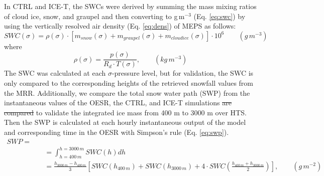 \documentclass{ametsocV5}
\providecommand{\DIFdel}[1]{{\protect\color{red}\sout{#1}}}                      %
\providecommand{\DIFaddbegin}{} %
\providecommand{\DIFaddend}{} %
\providecommand{\DIFdelbegin}{} %
\providecommand{\DIFdelend}{} %
\newcommand{\DIFscaledelfig}{0.5}
\newlength{\DIFdelgraphicswidth} %
\newlength{\DIFdelgraphicsheight} %
\newcommand{\DIFaddincludegraphics}[2][]{{\color{blue}\fbox{\DIFOincludegraphics[#1]{#2}}}} %
\newcommand{\DIFdelincludegraphics}[2][]{%
\sbox{\DIFdelgraphicsbox}{\DIFOincludegraphics[#1]{#2}}%
\settoboxwidth{\DIFdelgraphicswidth}{\DIFdelgraphicsbox} %
\settoboxtotalheight{\DIFdelgraphicsheight}{\DIFdelgraphicsbox} %
\scalebox{\DIFscaledelfig}{%
\parbox[b]{\DIFdelgraphicswidth}{\usebox{\DIFdelgraphicsbox}\\[-\baselineskip] \rule{\DIFdelgraphicswidth}{0em}}\llap{\resizebox{\DIFdelgraphicswidth}{\DIFdelgraphicsheight}{%
\setlength{\unitlength}{\DIFdelgraphicswidth}%
\begin{picture}(1,1)%
\thicklines\linethickness{2pt} %
{\color[rgb]{1,0,0}\put(0,0){\framebox(1,1){}}}%
{\color[rgb]{1,0,0}\put(0,0){\line( 1,1){1}}}%
{\color[rgb]{1,0,0}\put(0,1){\line(1,-1){1}}}%
\end{picture}%
}\hspace*{3pt}}} %
} %
\DeclareRobustCommand{\DIFaddbegin}{\DIFOaddbegin \let\includegraphics\DIFaddincludegraphics} %
\DeclareRobustCommand{\DIFaddend}{\DIFOaddend \let\includegraphics\DIFOincludegraphics} %
\DeclareRobustCommand{\DIFdelbegin}{\DIFOdelbegin \let\includegraphics\DIFdelincludegraphics} %
\DeclareRobustCommand{\DIFdelend}{\DIFOaddend \let\includegraphics\DIFOincludegraphics} %
\begin{document}
		In CTRL and ICE-T, the SWCs were derived by summing the mass mixing ratios of cloud ice, snow, and graupel and then converting to g\,m$^{-3}$ (Eq. \ref{eq:swc}) by using the vertically resolved air density (Eq. \ref{eq:dens}) of MEPS as follows:
		\begin{equation}
			SWC(\sigma) = \rho(\sigma) \cdot [m_{snow}(\sigma) + m_{graupel}(\sigma) + m_{cloud ice}(\sigma)] \cdot 10^6 \qquad (g\,m^{-3})
			\label{eq:swc}
		\end{equation}
		where
		\begin{equation}
			\rho(\sigma) = \frac{p(\sigma)}{R_d \cdot T(\sigma)}, \qquad (kg\,m^{-3})
			\label{eq:dens}
		\end{equation}
		The SWC was calculated at each $\sigma$-pressure level, but for validation, the SWC is only compared to the corresponding heights of the retrieved snowfall values from the MRR. Additionally, we compare the total snow water path (SWP) from the instantaneous values of the OESR, the CTRL, and ICE-T simulations \DIFdelbegin \DIFdel{are compared }\DIFdelend to validate the integrated ice mass from 400 m to 3000 m over HTS. Then the SWP is calculated at each hourly instantaneous output of the model and corresponding time in the OESR with Simpson's rule (Eq. \ref{eq:swp}).
		\begin{equation}
		\DIFdelbegin %
\DIFdelend \DIFaddbegin \begin{split}
		SWP =\\
		&\quad = \int_{h = 400\,m}^{h = 3000\,m} SWC(h) dh  \\
		&\quad = \frac{h_{3000\,m} - h_{400\,m}}{3} \left[ SWC(h_{400\,m}) + SWC(h_{3000\,m}) + 4 \cdot SWC \left( \frac{h_{400\,m} + h_{3000\,m}}{2}\right) \right], \qquad (g\,m^{-2})
		\end{split}\DIFaddend 
		\label{eq:swp}
		\end{equation}



\end{document}
